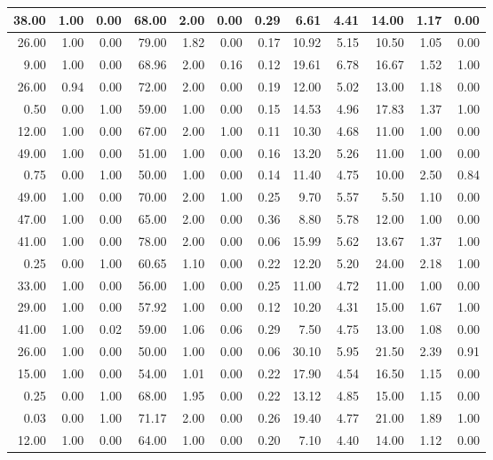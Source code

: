 \documentclass[
]{article}
\begin{document}
\begin{tabular}{r|r|r|r|r|r|r|r|r|r|r|r}
\hline
38.00 & 1.00 & 0.00 & 68.00 & 2.00 & 0.00 & 0.29 & 6.61 & 4.41 & 14.00 & 1.17 & 0.00\\
\hline
26.00 & 1.00 & 0.00 & 79.00 & 1.82 & 0.00 & 0.17 & 10.92 & 5.15 & 10.50 & 1.05 & 0.00\\
\hline
9.00 & 1.00 & 0.00 & 68.96 & 2.00 & 0.16 & 0.12 & 19.61 & 6.78 & 16.67 & 1.52 & 1.00\\
\hline
26.00 & 0.94 & 0.00 & 72.00 & 2.00 & 0.00 & 0.19 & 12.00 & 5.02 & 13.00 & 1.18 & 0.00\\
\hline
0.50 & 0.00 & 1.00 & 59.00 & 1.00 & 0.00 & 0.15 & 14.53 & 4.96 & 17.83 & 1.37 & 1.00\\
\hline
12.00 & 1.00 & 0.00 & 67.00 & 2.00 & 1.00 & 0.11 & 10.30 & 4.68 & 11.00 & 1.00 & 0.00\\
\hline
49.00 & 1.00 & 0.00 & 51.00 & 1.00 & 0.00 & 0.16 & 13.20 & 5.26 & 11.00 & 1.00 & 0.00\\
\hline
0.75 & 0.00 & 1.00 & 50.00 & 1.00 & 0.00 & 0.14 & 11.40 & 4.75 & 10.00 & 2.50 & 0.84\\
\hline
49.00 & 1.00 & 0.00 & 70.00 & 2.00 & 1.00 & 0.25 & 9.70 & 5.57 & 5.50 & 1.10 & 0.00\\
\hline
47.00 & 1.00 & 0.00 & 65.00 & 2.00 & 0.00 & 0.36 & 8.80 & 5.78 & 12.00 & 1.00 & 0.00\\
\hline
41.00 & 1.00 & 0.00 & 78.00 & 2.00 & 0.00 & 0.06 & 15.99 & 5.62 & 13.67 & 1.37 & 1.00\\
\hline
0.25 & 0.00 & 1.00 & 60.65 & 1.10 & 0.00 & 0.22 & 12.20 & 5.20 & 24.00 & 2.18 & 1.00\\
\hline
33.00 & 1.00 & 0.00 & 56.00 & 1.00 & 0.00 & 0.25 & 11.00 & 4.72 & 11.00 & 1.00 & 0.00\\
\hline
29.00 & 1.00 & 0.00 & 57.92 & 1.00 & 0.00 & 0.12 & 10.20 & 4.31 & 15.00 & 1.67 & 1.00\\
\hline
41.00 & 1.00 & 0.02 & 59.00 & 1.06 & 0.06 & 0.29 & 7.50 & 4.75 & 13.00 & 1.08 & 0.00\\
\hline
26.00 & 1.00 & 0.00 & 50.00 & 1.00 & 0.00 & 0.06 & 30.10 & 5.95 & 21.50 & 2.39 & 0.91\\
\hline
15.00 & 1.00 & 0.00 & 54.00 & 1.01 & 0.00 & 0.22 & 17.90 & 4.54 & 16.50 & 1.15 & 0.00\\
\hline
0.25 & 0.00 & 1.00 & 68.00 & 1.95 & 0.00 & 0.22 & 13.12 & 4.85 & 15.00 & 1.15 & 0.00\\
\hline
0.03 & 0.00 & 1.00 & 71.17 & 2.00 & 0.00 & 0.26 & 19.40 & 4.77 & 21.00 & 1.89 & 1.00\\
\hline
12.00 & 1.00 & 0.00 & 64.00 & 1.00 & 0.00 & 0.20 & 7.10 & 4.40 & 14.00 & 1.12 & 0.00\\

\end{tabular}
\end{document}

